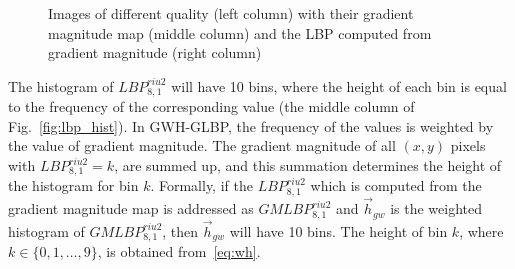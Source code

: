 \begin{figure}
\begin{subfigure}[b]{0.3\textwidth}
         \caption{}
         \label{}
     \end{subfigure}
        \caption{Images of different quality (left column) with their gradient magnitude map (middle column) and the LBP computed from gradient magnitude (right column)}
        \label{fig:lbp_dsts}
\end{figure}

The histogram of $LBP_{8, 1}^{riu2}$ will have 10 bins, where the height of each bin is equal to the frequency of the corresponding value (the middle column of Fig.~\ref{fig:lbp_hist}). In GWH-GLBP, the frequency of the values is weighted by the value of gradient magnitude. The gradient magnitude of all $(x, y)$ pixels with $LBP_{8, 1}^{riu2}=k$, are summed up, and this summation determines the height of the histogram for bin $k$. Formally, if the $LBP_{8, 1}^{riu2}$ which is computed from the gradient magnitude map is addressed as $GMLBP_{8, 1}^{riu2}$ and $\Vec{h}_{gw}$ is the weighted histogram of $GMLBP_{8, 1}^{riu2}$, then $\Vec{h}_{gw}$ will have 10 bins. The height of bin $k$, where $k\in \{0, 1,\ldots, 9\}$, is obtained from~\ref{eq:wh}.

